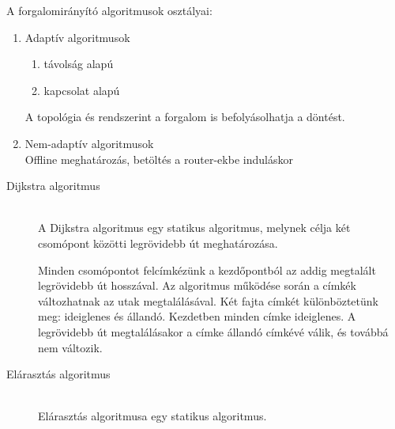 \documentclass[margin=0px]{article}
\begin{document}
\begin{description}
        A forgalomirányító algoritmusok osztályai:
        \begin{enumerate}
            \item Adaptív algoritmusok
                  \begin{enumerate}
                      \item távolság alapú
                      \item kapcsolat alapú
                  \end{enumerate}
                  A topológia és rendszerint a forgalom is befolyásolhatja a döntést.
            \item Nem-adaptív algoritmusok \\
                  Offline meghatározás, betöltés a router-ekbe induláskor
        \end{enumerate}

        \begin{description}
            \item[Dijkstra algoritmus] \hfill \\
                A Dijkstra algoritmus egy statikus algoritmus, melynek célja két csomópont közötti legrövidebb út meghatározása.

                Minden csomópontot felcímkézünk a kezdőpontból az addig megtalált legrövidebb út hosszával. Az algoritmus működése során a címkék változhatnak az utak megtalálásával. Két fajta címkét különböztetünk meg: ideiglenes és állandó. Kezdetben minden címke ideiglenes. A legrövidebb út megtalálásakor a címke állandó címkévé válik, és továbbá nem változik.
            \item[Elárasztás algoritmus] \hfill \\
                Elárasztás algoritmusa egy statikus algoritmus.


\end{description}
\end{description}
\end{document}
